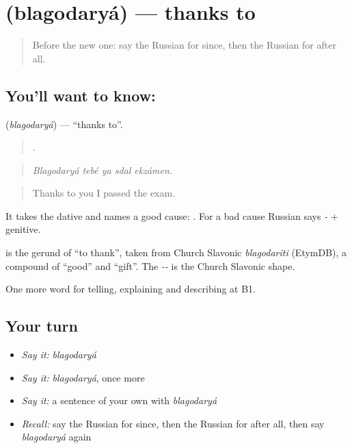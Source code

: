 \section[\texorpdfstring{\ru{благодаря} (blagodaryá)}{благодаря (blagodaryá)}]{ (blagodaryá) — thanks to}

\label{lesson:RU-C351-blagodarya}



\begin{quote}
Before the new one: say the Russian for since, then the Russian for after all.
\end{quote}

\subsection*{You'll want to know: }
\textbf{} (\emph{blagodaryá}) — \textquotedblleft{}thanks to\textquotedblright{}.

\begin{quote}
    .
\end{quote}

\begin{quote}
\emph{Blagodaryá tebé ya sdal ekzámen.}
\end{quote}

\begin{quote}
Thanks to you I passed the exam.
\end{quote}

It takes the dative and names a good cause: \emph{ }. For a bad cause Russian says \emph{-} + genitive.

\begin{cousinweb}
\textbf{} is the gerund of \emph{} \textquotedblleft{}to thank\textquotedblright{}, taken from Church Slavonic \emph{blagodariti} (EtymDB), a compound of \emph{} \textquotedblleft{}good\textquotedblright{} and \emph{} \textquotedblleft{}gift\textquotedblright{}. The \emph{--} is the Church Slavonic shape.
\end{cousinweb}

\begin{grammarlens}[title={What you've built}]
One more word for telling, explaining and describing at B1.
\end{grammarlens}

\subsection*{Your turn}
\begin{itemize}
\raggedright
  \item \emph{Say it:} \emph{blagodaryá}
  \item \emph{Say it:} \emph{blagodaryá}, once more
  \item \emph{Say it:} a sentence of your own with \emph{blagodaryá}
  \item \emph{Recall:} say the Russian for since, then the Russian for after all, then say \emph{blagodaryá} again
\end{itemize}


